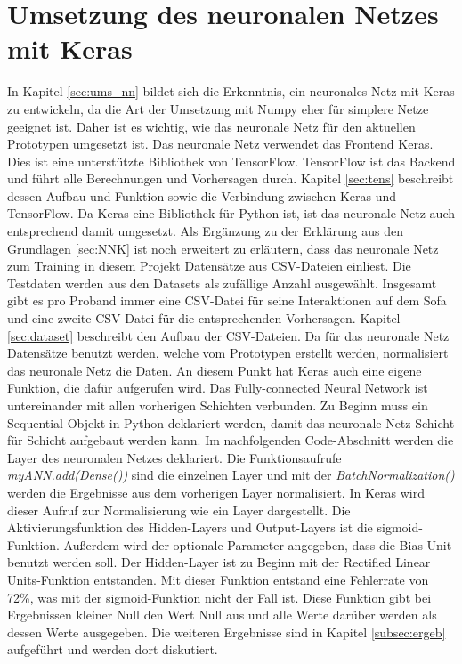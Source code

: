 \section{Umsetzung des neuronalen Netzes mit Keras}
\label{ssec:nn_keras}
In Kapitel \ref{sec:ums_nn} bildet sich die Erkenntnis, ein neuronales Netz mit Keras zu entwickeln, da die Art der Umsetzung mit Numpy eher für simplere Netze geeignet ist. Daher ist es wichtig, wie das neuronale Netz für den aktuellen Prototypen umgesetzt ist. 
\newline
\newline
Das neuronale Netz verwendet das Frontend Keras. Dies ist eine unterstützte Bibliothek von TensorFlow. TensorFlow ist das Backend und führt alle Berechnungen und Vorhersagen durch. Kapitel \ref{sec:tens} beschreibt dessen Aufbau und Funktion sowie die Verbindung zwischen Keras und TensorFlow. Da Keras eine Bibliothek für Python ist, ist das neuronale Netz auch entsprechend damit umgesetzt.
\newline
Als Ergänzung zu der Erklärung aus den Grundlagen \ref{sec:NNK} ist noch erweitert zu erläutern, dass das neuronale Netz zum Training in diesem Projekt Datensätze aus CSV-Dateien einliest. Die Testdaten werden aus den Datasets als zufällige Anzahl ausgewählt. Insgesamt gibt es pro Proband immer eine CSV-Datei für seine Interaktionen auf dem Sofa und eine zweite CSV-Datei für die entsprechenden Vorhersagen. Kapitel \ref{sec:dataset} beschreibt den Aufbau der CSV-Dateien. Da für das neuronale Netz Datensätze benutzt werden, welche vom Prototypen erstellt werden, normalisiert das neuronale Netz die Daten. An diesem Punkt hat Keras auch eine eigene Funktion, die dafür aufgerufen wird.
\newline
Das Fully-connected Neural Network ist untereinander mit allen vorherigen Schichten verbunden. Zu Beginn muss ein Sequential-Objekt in Python deklariert werden, damit das neuronale Netz Schicht für Schicht aufgebaut werden kann. Im nachfolgenden Code-Abschnitt werden die Layer des neuronalen Netzes deklariert. Die Funktionsaufrufe \emph{myANN.add(Dense())} sind die einzelnen Layer und mit der \emph{BatchNormalization()} werden die Ergebnisse aus dem vorherigen Layer normalisiert. In Keras wird dieser Aufruf zur Normalisierung wie ein Layer dargestellt. Die Aktivierungsfunktion des Hidden-Layers und Output-Layers ist die sigmoid-Funktion. Außerdem wird der optionale Parameter angegeben, dass die Bias-Unit benutzt werden soll. Der Hidden-Layer ist zu Beginn mit der Rectified Linear Units-Funktion entstanden. Mit dieser Funktion entstand eine Fehlerrate von 72\%, was mit der sigmoid-Funktion nicht der Fall ist. Diese Funktion gibt bei Ergebnissen kleiner Null den Wert Null aus und alle Werte darüber werden als dessen Werte ausgegeben. Die weiteren Ergebnisse sind in Kapitel \ref{subsec:ergeb} aufgeführt und werden dort diskutiert.
